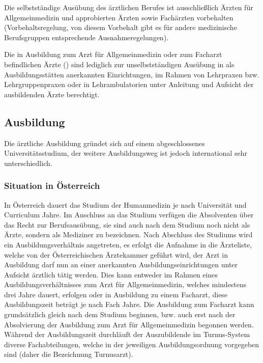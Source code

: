 Die selbstständige Ausübung des ärztlichen Berufes
ist ausschließlich Ärzten für Allgemeinmedizin und
approbierten Ärzten sowie Fachärzten vorbehalten
(Vorbehaltsregelung, von diesem Vorbehalt gibt es
für andere medizinische Berufsgruppen
entsprechende Ausnahmeregelungen).

Die in Ausbildung zum Arzt für Allgemeinmedizin oder zum
Facharzt befindlichen Ärzte () sind lediglich zur
unselbstständigen Ausübung  in  als
Ausbildungsstätten anerkannten Einrichtungen, im Rahmen von
Lehrpraxen bzw. Lehrgruppenpraxen oder in Lehrambulatorien
unter Anleitung und Aufsicht der ausbildenden Ärzte
berechtigt.




\subsection{Ausbildung}

Die ärztliche Ausbildung gründet sich auf einem
abgeschlossenes Universitätsstudium, der weitere
Ausbildungsweg ist jedoch international sehr
unterschiedlich.

\subsubsection{Situation in Österreich}

In Österreich dauert das Studium der Humanmedizin je nach
Universität und Curriculum  Jahre. Im Anschluss an das
Studium verfügen die Absolventen  über das Recht zur
Berufsausübung, sie sind auch nach dem
Studium noch nicht als Ärzte, sondern als Mediziner zu
bezeichnen. Nach Abschluss des Studiums wird ein
Ausbildungsverhältnis angetreten, es erfolgt die Aufnahme in
die Ärzteliste, welche von der Österreichischen Ärztekammer
geführt wird, der Arzt in Ausbildung darf nun an einer
anerkannten Ausbildungseinrichtungen unter 
Aufsicht ärztlich tätig werden. Dies kann entweder im Rahmen
eines Ausbildungsverhältnisses zum Arzt für Allgemeinmedizin,
welches mindestens drei Jahre dauert, erfolgen oder in Ausbildung zu
einem Facharzt, diese Ausbildungszeit beträgt je nach Fach
 Jahre. Die Ausbildung zum Facharzt kann
grundsätzlich gleich nach dem Studium beginnen, bzw. auch erst nach der
Absolvierung der Ausbildung zum Arzt für Allgemeinmedizin
begonnen werden. Während der Ausbildungszeit durchläuft der
Auszubildende  im Turnus-System diverse
Fachabteilungen, welche in der jeweiligen Ausbildungsordnung
vorgegeben sind (daher die Bezeichnung Turnusarzt). 

